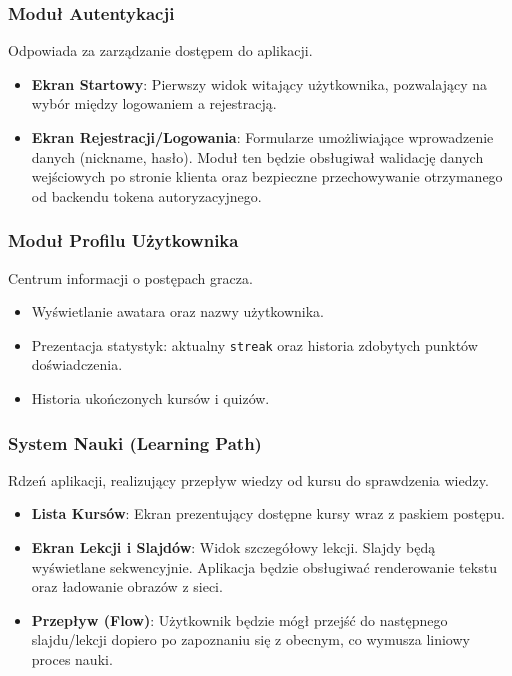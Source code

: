 \documentclass[11pt,a4paper]{article}
\numberwithin{equation}{section}
\begin{document}
\subsubsection{Moduł Autentykacji}
Odpowiada za zarządzanie dostępem do aplikacji.
\begin{itemize}
    \item \textbf{Ekran Startowy}: Pierwszy widok witający użytkownika, pozwalający na wybór między logowaniem a rejestracją.
    \item \textbf{Ekran Rejestracji/Logowania}: Formularze umożliwiające wprowadzenie danych (nickname, hasło). Moduł ten będzie obsługiwał walidację danych wejściowych po stronie klienta oraz bezpieczne przechowywanie otrzymanego od backendu tokena autoryzacyjnego.
\end{itemize}

\subsubsection{Moduł Profilu Użytkownika}
Centrum informacji o postępach gracza.
\begin{itemize}
    \item Wyświetlanie awatara oraz nazwy użytkownika.
    \item Prezentacja statystyk: aktualny \texttt{streak} oraz historia zdobytych punktów doświadczenia.
    \item Historia ukończonych kursów i quizów.
\end{itemize}

\subsubsection{System Nauki (Learning Path)}
Rdzeń aplikacji, realizujący przepływ wiedzy od kursu do sprawdzenia wiedzy.
\begin{itemize}
    \item \textbf{Lista Kursów}: Ekran prezentujący dostępne kursy  wraz z paskiem postępu.
    \item \textbf{Ekran Lekcji i Slajdów}: Widok szczegółowy lekcji. Slajdy będą wyświetlane sekwencyjnie. Aplikacja będzie obsługiwać renderowanie tekstu oraz ładowanie obrazów z sieci.
    \item \textbf{Przepływ (Flow)}: Użytkownik będzie mógł przejść do następnego slajdu/lekcji dopiero po zapoznaniu się z obecnym, co wymusza liniowy proces nauki.
\end{itemize}
\end{document}
